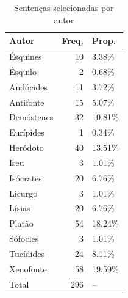 
\begin{table}[!htb]

\caption{\label{tab:porautor}Sentenças selecionadas por autor}
\centering
\begin{tabular}[t]{lrl}
\toprule
Autor & Freq. & Prop.\\
\midrule
Ésquines & 10 & 3.38\%\\
Ésquilo & 2 & 0.68\%\\
Andócides & 11 & 3.72\%\\
Antifonte & 15 & 5.07\%\\
Demóstenes & 32 & 10.81\%\\
\addlinespace
Eurípides & 1 & 0.34\%\\
Heródoto & 40 & 13.51\%\\
Iseu & 3 & 1.01\%\\
Isócrates & 20 & 6.76\%\\
Licurgo & 3 & 1.01\%\\
\addlinespace
Lísias & 20 & 6.76\%\\
Platão & 54 & 18.24\%\\
Sófocles & 3 & 1.01\%\\
Tucídides & 24 & 8.11\%\\
Xenofonte & 58 & 19.59\%\\
\midrule
Total & 296 & --\\
\bottomrule
\end{tabular}
\end{table} 
